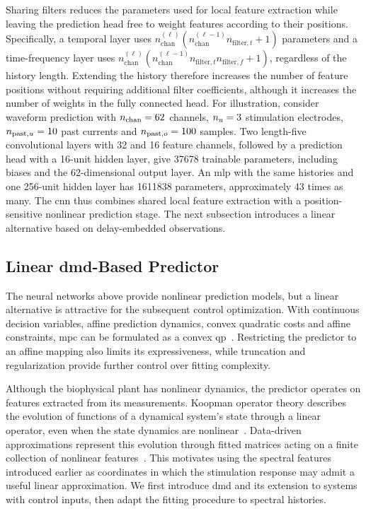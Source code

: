 Sharing filters reduces the parameters used for local feature extraction while leaving the prediction head free to weight features according to their positions.
Specifically, a temporal layer uses $n_{\mathrm{chan}}^{(\ell)}(n_{\mathrm{chan}}^{(\ell-1)}n_{\mathrm{filter},t}+1)$ parameters and a time-frequency layer uses $n_{\mathrm{chan}}^{(\ell)}(n_{\mathrm{chan}}^{(\ell-1)}n_{\mathrm{filter},t}n_{\mathrm{filter},f}+1)$, regardless of the history length.
Extending the history therefore increases the number of feature positions without requiring additional filter coefficients, although it increases the number of weights in the fully connected head.
For illustration, consider waveform prediction with $n_{\mathrm{chan}}{}=62$ channels, $n_{u}=3$ stimulation electrodes, $n_{\mathrm{past},u}=10$ past currents and $n_{\mathrm{past},o}=100$ samples.
Two length-five convolutional layers with 32 and 16 feature channels, followed by a prediction head with a 16-unit hidden layer, give \num{37678} trainable parameters, including biases and the 62-dimensional output layer.
An \ac{mlp} with the same histories and one 256-unit hidden layer has \num{1611838} parameters, approximately 43 times as many.
The \ac{cnn} thus combines shared local feature extraction with a position-sensitive nonlinear prediction stage.
The next subsection introduces a linear alternative based on delay-embedded observations.

\subsection{Linear \acs{dmd}-Based Predictor}\label{sec:linear_dmd_predictor}

The neural networks above provide nonlinear prediction models, but a linear alternative is attractive for the subsequent control optimization.
With continuous decision variables, affine prediction dynamics, convex quadratic costs and affine constraints, \ac{mpc} can be formulated as a convex \ac{qp}~\cite{Rawlings2017}.
Restricting the predictor to an affine mapping also limits its expressiveness, while truncation and regularization provide further control over fitting complexity.

Although the biophysical plant has nonlinear dynamics, the predictor operates on features extracted from its measurements.
Koopman operator theory describes the evolution of functions of a dynamical system's state through a linear operator, even when the state dynamics are nonlinear~\cite{Brunton2016}.
Data-driven approximations represent this evolution through fitted matrices acting on a finite collection of nonlinear features~\cite{Williams2015}.
This motivates using the spectral features introduced earlier as coordinates in which the stimulation response may admit a useful linear approximation.
We first introduce \ac{dmd} and its extension to systems with control inputs, then adapt the fitting procedure to spectral histories.

